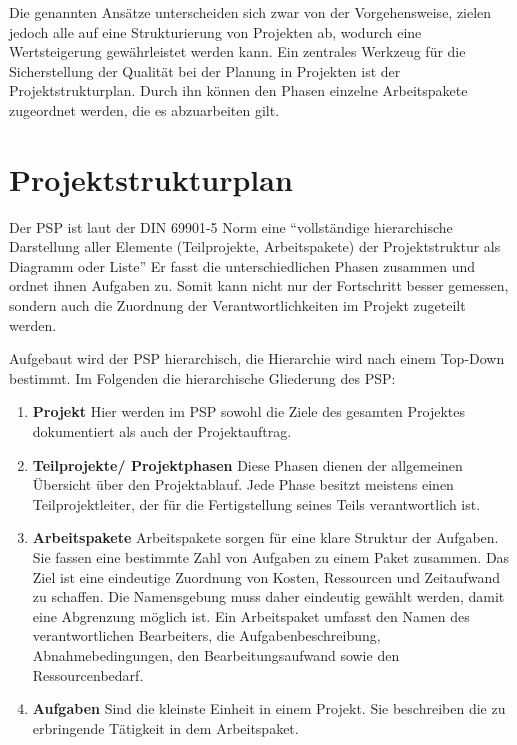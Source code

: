 	Die genannten Ansätze unterscheiden sich zwar von der Vorgehensweise, zielen jedoch alle auf eine Strukturierung von Projekten ab, wodurch eine Wertsteigerung gewährleistet werden kann. Ein zentrales Werkzeug für die Sicherstellung der Qualität bei der Planung in Projekten ist der Projektstrukturplan. Durch ihn können den Phasen einzelne Arbeitspakete zugeordnet werden, die es abzuarbeiten gilt. 

\section{Projektstrukturplan}
	Der \ac{PSP} ist laut der DIN 69901-5 Norm eine \enquote{vollständige hierarchische
	Darstellung aller Elemente (Teilprojekte, Arbeitspakete) der Projektstruktur als
	Diagramm oder Liste}\autocite{DIN_Projektplan}
	Er fasst die unterschiedlichen Phasen zusammen und ordnet ihnen Aufgaben zu. Somit kann nicht nur der Fortschritt besser gemessen, sondern auch die Zuordnung der Verantwortlichkeiten im Projekt zugeteilt werden. 
	
	Aufgebaut wird der \acs{PSP} hierarchisch, die Hierarchie wird nach einem Top-Down bestimmt. Im Folgenden die hierarchische Gliederung des \acs{PSP}: 
	
	\begin{enumerate}
		\item \textbf{Projekt}
			\subitem Hier werden im \acs{PSP} sowohl die Ziele des gesamten Projektes dokumentiert als auch der Projektauftrag. 
			
		\item \textbf{Teilprojekte/ Projektphasen}
			\subitem Diese Phasen dienen der allgemeinen Übersicht über den Projektablauf. Jede Phase besitzt meistens einen Teilprojektleiter, der für die Fertigstellung seines Teils verantwortlich ist. 
		
		\item \textbf{Arbeitspakete}
			\subitem Arbeitspakete sorgen für eine klare Struktur der Aufgaben. Sie fassen eine bestimmte Zahl von Aufgaben zu einem Paket zusammen. Das Ziel ist eine eindeutige Zuordnung von Kosten, Ressourcen und Zeitaufwand zu schaffen. Die Namensgebung muss daher eindeutig gewählt werden, damit eine Abgrenzung möglich ist. Ein Arbeitspaket umfasst den Namen des verantwortlichen Bearbeiters, die Aufgabenbeschreibung, Abnahmebedingungen, den Bearbeitungsaufwand sowie den Ressourcenbedarf. 
		
		\item \textbf{Aufgaben}
			\subitem Sind die kleinste Einheit in einem Projekt. Sie beschreiben die zu erbringende Tätigkeit in dem Arbeitspaket. 
		
	\end{enumerate}

